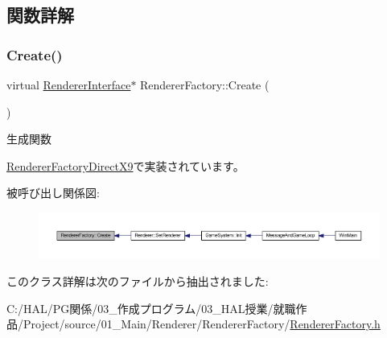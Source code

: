 \subsection{関数詳解}
\mbox{\label{class_renderer_factory_a1907fb4787bf1abdf48443c1e87c0f13}} 
\subsubsection{\texorpdfstring{Create()}{Create()}}
{\footnotesize\ttfamily virtual \mbox{\hyperlink{class_renderer_interface}{Renderer\+Interface}}$\ast$ Renderer\+Factory\+::\+Create (\begin{DoxyParamCaption}{ }\end{DoxyParamCaption})\hspace{0.3cm}{\ttfamily [pure virtual]}}



生成関数 



\mbox{\hyperlink{class_renderer_factory_direct_x9_aa64ac54f3efe121f531a28dd3b7690e3}{Renderer\+Factory\+Direct\+X9}}で実装されています。

被呼び出し関係図\+:\nopagebreak
\begin{figure}[H]
\begin{center}
\leavevmode
\includegraphics[width=350pt]{class_renderer_factory_a1907fb4787bf1abdf48443c1e87c0f13_icgraph}
\end{center}
\end{figure}


このクラス詳解は次のファイルから抽出されました\+:\begin{DoxyCompactItemize}
\item 
C\+:/\+H\+A\+L/\+P\+G関係/03\+\_\+作成プログラム/03\+\_\+\+H\+A\+L授業/就職作品/\+Project/source/01\+\_\+\+Main/\+Renderer/\+Renderer\+Factory/\mbox{\hyperlink{_renderer_factory_8h}{Renderer\+Factory.\+h}}\end{DoxyCompactItemize}
